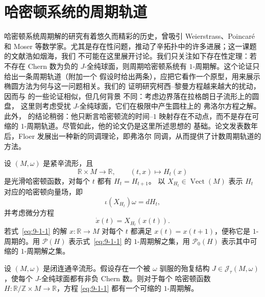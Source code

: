 \section{哈密顿系统的周期轨道}\label{sec:9-1}

哈密顿系统周期解的研究有着悠久而精彩的历史，曾吸引 Weierstrass、Poincaré 和 Moser
等数学家。尤其是存在性问题，推动了辛拓扑中的许多进展；这一课题的文献浩如烟海，我们
不可能在这里展开讨论。我们只关注如下存在性定理：若不存在 Chern 数为负的
$J$-全纯球面，则周期哈密顿系统有 $1$-周期解。这个论证只给出一条周期轨道（附加一个
假设时给出两条），应把它看作一个原型，用来展示椭圆方法为何与这一问题相关。我们的
证明研究柯西--黎曼方程越来越大的扰动，因而与
 的一些论证相似，但几何背景
不同：考虑边界落在拉格朗日子流形上的圆盘，
这里则考虑受扰 $J$-全纯球面，它们在极限中产生圆柱上的 弗洛尔方程之解。此外，
的结论稍弱：他只断言哈密顿流的时间--$1$
映射存在不动点，而不是存在可缩的 $1$-周期轨道。尽管如此，他的论文仍是这里所述思想的
基础。论文发表数年后，Floer  发展出一种新的同调理论，即弗洛尔
同调，从而提供了计数周期轨道的方法。

设 $(M,\omega)$ 是紧辛流形，且
\[
  \mathbb R\times M\longrightarrow\mathbb R,
  \qquad (t,x)\longmapsto H_t(x)
\]
是光滑哈密顿函数，对每个 $t$ 都有 $H_t=H_{t+1}$。
以 $X_{H_t}\in\operatorname{Vect}(M)$ 表示 $H_t$ 对应的哈密顿向量场，即
\[
  \iota(X_{H_t})\omega=dH_t,
\]
并考虑微分方程
\begin{equation}\label{eq:9-1-1}
  \dot x(t)=X_{H_t}(x(t)).
\end{equation}
若式~\eqref{eq:9-1-1} 的解 $x:\mathbb R\to M$ 对每个 $t$ 都满足
$x(t)=x(t+1)$，便称它是 $1$-周期的。用 $\mathcal P(H)$ 表示式~\eqref{eq:9-1-1}
的 $1$-周期解之集，用 $\mathcal P_0(H)$ 表示其中可缩的 $1$-周期解之集。

\begin{theorem}\label{thm:9-1-1}
设 $(M,\omega)$ 是闭连通辛流形。假设存在一个被 $\omega$ 驯服的殆复结构
$J\in\mathcal J_\tau(M,\omega)$，使每个 $J$-全纯球面都有非负 Chern 数。则对于每个
哈密顿函数 $H:\mathbb R/\mathbb Z\times M\to\mathbb R$，方程
\eqref{eq:9-1-1} 都有一个可缩的 $1$-周期解。
\end{theorem}

